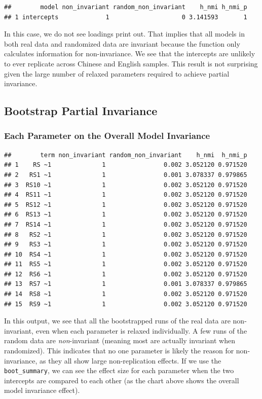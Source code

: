 \documentclass[
  man]{apa7}
\begin{document}
\begin{verbatim}
##        model non_invariant random_non_invariant    h_nmi h_nmi_p
## 1 intercepts             1                    0 3.141593       1
\end{verbatim}

In this case, we do not see loadings print out. That implies that all models in both real data and randomized data are invariant because the function only calculates information for non-invariance. We see that the intercepts are unlikely to ever replicate across Chinese and English samples. This result is not surprising given the large number of relaxed parameters required to achieve partial invariance.

\subsection{Bootstrap Partial Invariance}\label{bootstrap-partial-invariance}

\subsubsection{Each Parameter on the Overall Model Invariance}\label{each-parameter-on-the-overall-model-invariance}

\begin{verbatim}
##        term non_invariant random_non_invariant    h_nmi  h_nmi_p
## 1    RS ~1              1                0.002 3.052120 0.971520
## 2   RS1 ~1              1                0.001 3.078337 0.979865
## 3  RS10 ~1              1                0.002 3.052120 0.971520
## 4  RS11 ~1              1                0.002 3.052120 0.971520
## 5  RS12 ~1              1                0.002 3.052120 0.971520
## 6  RS13 ~1              1                0.002 3.052120 0.971520
## 7  RS14 ~1              1                0.002 3.052120 0.971520
## 8   RS2 ~1              1                0.002 3.052120 0.971520
## 9   RS3 ~1              1                0.002 3.052120 0.971520
## 10  RS4 ~1              1                0.002 3.052120 0.971520
## 11  RS5 ~1              1                0.002 3.052120 0.971520
## 12  RS6 ~1              1                0.002 3.052120 0.971520
## 13  RS7 ~1              1                0.001 3.078337 0.979865
## 14  RS8 ~1              1                0.002 3.052120 0.971520
## 15  RS9 ~1              1                0.002 3.052120 0.971520
\end{verbatim}

In this output, we see that all the bootstrapped runs of the real data are non-invariant, even when each parameter is relaxed individually. A few runs of the random data are \emph{non}-invariant (meaning most are actually invariant when randomized). This indicates that no one parameter is likely the reason for non-invariance, as they all show large non-replication effects. If we use the \texttt{boot\_summary}, we can see the effect size for each parameter when the two intercepts are compared to each other (as the chart above shows the overall model invariance effect).
\end{document}
